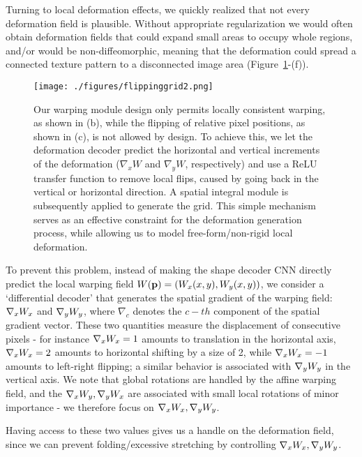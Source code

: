 \documentclass[runningheads]{llncs}
\begin{document}
Turning to local deformation effects, we quickly realized that not every deformation field is plausible. Without appropriate regularization we would often obtain deformation fields that could expand small areas to occupy whole regions, and/or would be non-diffeomorphic, meaning that the deformation could spread a connected texture pattern to a disconnected image area (Figure~\ref{fig:gradient}-(f)). 

\begin{figure}
    \centering
    \texttt{[image: ./figures/flippinggrid2.png]}
    \caption{Our warping module design only permits locally consistent warping, as shown in (b), while the flipping of  relative pixel positions, as shown in (c), is not allowed by design. 
    To achieve this, we  let the deformation decoder predict the horizontal and vertical increments of the deformation ($\nabla_x W$ and $\nabla_y W$, respectively) and use a ReLU transfer function to remove local flips, caused by going back in the vertical or horizontal direction. A spatial integral module is subsequently applied to generate the grid. This simple mechanism
    serves as an effective constraint for the deformation generation process, while allowing us to model free-form/non-rigid local deformation. }
    \label{fig:gradient}
     \vspace{-0.3cm}
\end{figure}

\label{integral}
To prevent this problem, instead of making the shape decoder CNN directly predict the local warping field $W(\mathbf{p}) = (W_x(x,y),W_y(x,y))$, we consider a `differential decoder' that generates the spatial gradient of the warping field: $\nabla_x W_x$ and $\nabla_y W_y$, where $\nabla_{c}$ denotes the $c-th$ component of the spatial gradient vector.   These two quantities measure the displacement of consecutive pixels -  for instance  $\nabla_x W_x=1$ amounts to translation in the horizontal axis, $\nabla_x W_x=2$ amounts to horizontal shifting by a size of 2, while $\nabla_x W_x=-1$ amounts to left-right flipping;  a similar behavior is associated with $\nabla_y W_y$ in the vertical axis.   We note that global rotations are handled by the affine warping field, and the $\nabla_x W_y, \nabla_y W_x$ are associated with small local rotations of minor importance - we therefore focus on $\nabla_x W_x, \nabla_y W_y$.

Having access to these two values gives us a handle on the deformation field, since we can prevent folding/excessive stretching by controlling $\nabla_x W_x, \nabla_y W_y$. 
\end{document}
